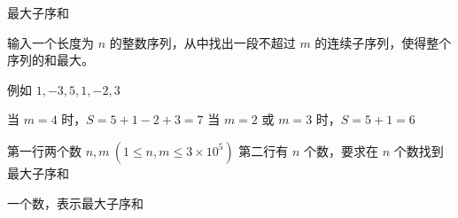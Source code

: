 最大子序和

输入一个长度为 $n$ 的整数序列，从中找出一段不超过 $m$ 的连续子序列，使得整个序列的和最大。

例如 $1, -3, 5, 1, -2, 3$

当 $m=4$ 时，$S=5+1-2+3=7$
当 $m=2$ 或 $m=3$ 时，$S=5+1=6$

第一行两个数 $n, m \ (1 \leq n, m \leq 3 \times 10^5)$
第二行有 $n$ 个数，要求在 $n$ 个数找到最大子序和

一个数，表示最大子序和
